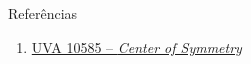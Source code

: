 \begin{frame}[fragile]{Referências}

    \begin{enumerate}
        \item \href{https://uva.onlinejudge.org/index.php?option=com_onlinejudge&Itemid=8&page=show_problem&category=24&problem=1526&mosmsg=Submission+received+with+ID+22823531}{UVA 10585 -- \textit{Center of Symmetry}}

    \end{enumerate}

\end{frame}
